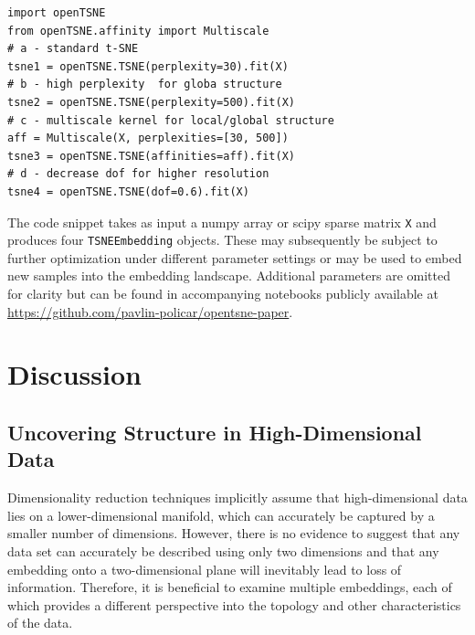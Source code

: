 \documentclass[twocolumn]{bmcart}
\begin{document}
\begin{verbatim}
import openTSNE
from openTSNE.affinity import Multiscale
# a - standard t-SNE
tsne1 = openTSNE.TSNE(perplexity=30).fit(X)
# b - high perplexity  for globa structure
tsne2 = openTSNE.TSNE(perplexity=500).fit(X)
# c - multiscale kernel for local/global structure
aff = Multiscale(X, perplexities=[30, 500])
tsne3 = openTSNE.TSNE(affinities=aff).fit(X)
# d - decrease dof for higher resolution
tsne4 = openTSNE.TSNE(dof=0.6).fit(X)
\end{verbatim}

\noindent The code snippet takes as input a \textsf{numpy} array or
\textsf{scipy} sparse matrix \texttt{X} and produces four
\texttt{TSNEEmbedding} objects. These may subsequently be subject to further
optimization under different parameter settings or may be used to embed new
samples into the embedding landscape. Additional parameters are omitted for
clarity but can be found in accompanying notebooks publicly available at
\url{https://github.com/pavlin-policar/opentsne-paper}.

\section*{Discussion}

\subsection*{Uncovering Structure in High-Dimensional Data}

Dimensionality reduction techniques implicitly assume that high-dimensional
data lies on a lower-dimensional manifold, which can accurately be captured by
a smaller number of dimensions. However, there is no evidence to suggest that
any data set can accurately be described using only two dimensions and that any
embedding onto a two-dimensional plane will inevitably lead to loss of
information. Therefore, it is beneficial to examine multiple embeddings, each
of which provides a different perspective into the topology and other
characteristics of the data.
\end{document}
